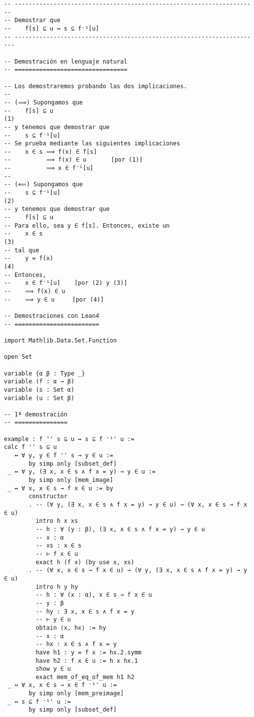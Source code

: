 \begin{verbatim}
-- ---------------------------------------------------------------------
-- Demostrar que
--    f[s] ⊆ u ↔ s ⊆ f⁻¹[u]
-- ----------------------------------------------------------------------

-- Demostración en lenguaje natural
-- ================================

-- Los demostraremos probando las dos implicaciones.
--
-- (⟹) Supongamos que
--    f[s] ⊆ u                                                       (1)
-- y tenemos que demostrar que
--    s ⊆ f⁻¹[u]
-- Se prueba mediante las siguientes implicaciones
--    x ∈ s ⟹ f(x) ∈ f[s]
--          ⟹ f(x) ∈ u       [por (1)]
--          ⟹ x ∈ f⁻¹[u]
--
-- (⟸) Supongamos que
--    s ⊆ f⁻¹[u]                                                     (2)
-- y tenemos que demostrar que
--    f[s] ⊆ u
-- Para ello, sea y ∈ f[s]. Entonces, existe un
--    x ∈ s                                                          (3)
-- tal que
--    y = f(x)                                                       (4)
-- Entonces,
--    x ∈ f⁻¹[u]    [por (2) y (3)]
--    ⟹ f(x) ∈ u
--    ⟹ y ∈ u     [por (4)]

-- Demostraciones con Lean4
-- ========================

import Mathlib.Data.Set.Function

open Set

variable {α β : Type _}
variable (f : α → β)
variable (s : Set α)
variable (u : Set β)

-- 1ª demostración
-- ===============

example : f '' s ⊆ u ↔ s ⊆ f ⁻¹' u :=
calc f '' s ⊆ u
   ↔ ∀ y, y ∈ f '' s → y ∈ u :=
       by simp only [subset_def]
 _ ↔ ∀ y, (∃ x, x ∈ s ∧ f x = y) → y ∈ u :=
       by simp only [mem_image]
 _ ↔ ∀ x, x ∈ s → f x ∈ u := by
       constructor
       . -- (∀ y, (∃ x, x ∈ s ∧ f x = y) → y ∈ u) → (∀ x, x ∈ s → f x ∈ u)
         intro h x xs
         -- h : ∀ (y : β), (∃ x, x ∈ s ∧ f x = y) → y ∈ u
         -- x : α
         -- xs : x ∈ s
         -- ⊢ f x ∈ u
         exact h (f x) (by use x, xs)
       . -- (∀ x, x ∈ s → f x ∈ u) → (∀ y, (∃ x, x ∈ s ∧ f x = y) → y ∈ u)
         intro h y hy
         -- h : ∀ (x : α), x ∈ s → f x ∈ u
         -- y : β
         -- hy : ∃ x, x ∈ s ∧ f x = y
         -- ⊢ y ∈ u
         obtain ⟨x, hx⟩ := hy
         -- x : α
         -- hx : x ∈ s ∧ f x = y
         have h1 : y = f x := hx.2.symm
         have h2 : f x ∈ u := h x hx.1
         show y ∈ u
         exact mem_of_eq_of_mem h1 h2
 _ ↔ ∀ x, x ∈ s → x ∈ f ⁻¹' u :=
       by simp only [mem_preimage]
 _ ↔ s ⊆ f ⁻¹' u :=
       by simp only [subset_def]


\end{verbatim}

